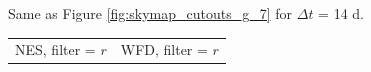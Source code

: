 \documentclass[preprintm,linenumbers]{aastex631}
\begin{document}
\begin{figure}
\begin{tabular}{@{}c@{}c@{}}
			\end{tabular}
			\caption{
   Same as Figure \ref{fig:skymap_cutouts_g_7} for $\Delta t$ = 14 d. 
    }
	\label{fig:skymap_cutouts_g_14}
		\end{figure}

  
  	\begin{figure}
			\centering
            			\begin{tabular}{@{}c@{}c@{}}
                 NES, filter = $r$ & WFD, filter = $r$ \\

\end{tabular}
\end{figure}
\end{document}
